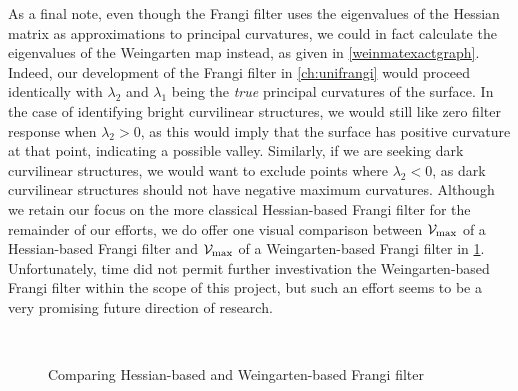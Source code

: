 As a final note, even though the Frangi filter uses the eigenvalues of the Hessian matrix as approximations to principal curvatures, we could in fact calculate the eigenvalues of the Weingarten map instead, as given in \cref{weinmatexactgraph}. Indeed, our development of the Frangi filter in \cref{ch:unifrangi} would proceed identically with $\lambda_2$ and $\lambda_1$ being the \textit{true} principal curvatures of the surface. In the case of identifying bright curvilinear structures, we would still like zero filter response when $\lambda_2 > 0$, as this would imply that the surface has positive curvature at that point, indicating a possible valley. Similarly, if we are seeking dark curvilinear structures, we would want to exclude points where $\lambda_2 < 0$, as dark curvilinear structures should not have negative maximum curvatures. Although we retain our focus on the more classical Hessian-based Frangi filter for the remainder of our efforts, we do offer one visual comparison between $\mathcal{V}_{\max}$ of a Hessian-based Frangi filter and  $\mathcal{V}_{\max}$ of a Weingarten-based Frangi filter in \cref{fig:compare-wein-hess-Vmax}.
Unfortunately, time did not permit further investivation the Weingarten-based Frangi filter within the scope of this project, but such an effort seems to be a very promising future direction of research.

\begin{figure}[t]\centering
  \\[12pt]
\caption{Comparing Hessian-based and Weingarten-based Frangi filter}
\label{fig:compare-wein-hess-Vmax}
\end{figure}

